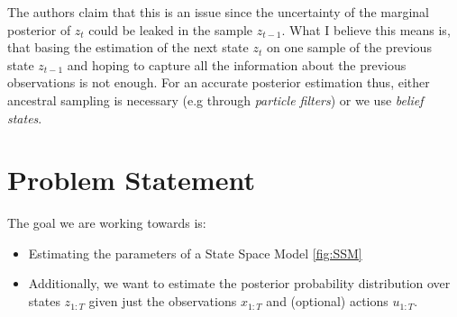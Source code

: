 \documentclass[10pt,twocolumn,letterpaper]{article}
\begin{document}
	The authors claim that this is an issue since the uncertainty of the marginal posterior of $z_t$ could be leaked in the sample $z_{t-1}$. What I believe this means is, that basing the estimation of the next state $z_t$ on one sample of the previous state $z_{t-1}$ and hoping to capture all the information about the previous observations is not enough. For an accurate posterior estimation thus, either ancestral sampling is necessary (e.g through \emph{particle filters}) or we use \emph{belief states}.
	
	\section{Problem Statement}
	
	The goal we are working towards is:
	 \begin{itemize}
	 	\item Estimating the parameters of a  State Space Model \ref{fig:SSM}
	 	\item Additionally, we want to estimate the posterior probability distribution over states $z_{1:T}$ given just the observations $x_{1:T}$ and (optional) actions $u_{1:T}$. 
	 \end{itemize}
	
\end{document}
